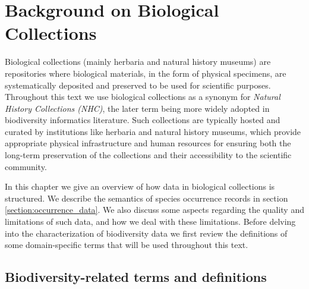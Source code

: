 \chapter{Background on Biological Collections}\label{biodiversity_data}



Biological collections (mainly herbaria and natural history museums) are repositories where biological materials, in the form of physical specimens, are systematically deposited and preserved to be used for scientific purposes. 
Throughout this text we use biological collections as a synonym for \textit{Natural History Collections (NHC)}, the later term being more widely adopted in biodiversity informatics literature.
Such collections are typically hosted and curated by institutions like herbaria and natural history museums, which provide appropriate physical infrastructure and human resources for ensuring both the long-term preservation of the collections and their accessibility to the scientific community.

In this chapter we give an overview of how data in biological collections is structured.
We describe the semantics of species occurrence records in section \ref{section:occurrence_data}.
We also discuss some aspects regarding the quality and limitations of such data, and how we deal with these limitations.
Before delving into the characterization of biodiversity data we first review the definitions of some domain-specific terms that will be used throughout this text. 

\section{Biodiversity-related terms and definitions} \label{section:biodiversity_terms}

